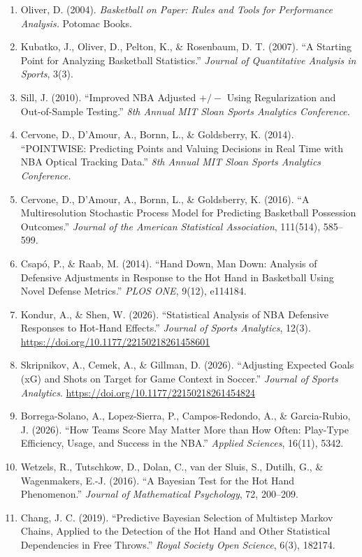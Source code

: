 \documentclass[11pt]{article}
\begin{document}
\begin{enumerate}
\item Oliver, D. (2004). \emph{Basketball on Paper: Rules and Tools for Performance Analysis.} Potomac Books.
\item Kubatko, J., Oliver, D., Pelton, K., \& Rosenbaum, D. T. (2007). ``A Starting Point for Analyzing Basketball Statistics.'' \emph{Journal of Quantitative Analysis in Sports}, 3(3).
\item Sill, J. (2010). ``Improved NBA Adjusted $+/-$ Using Regularization and Out-of-Sample Testing.'' \emph{8th Annual MIT Sloan Sports Analytics Conference.}
\item Cervone, D., D'Amour, A., Bornn, L., \& Goldsberry, K. (2014). ``POINTWISE: Predicting Points and Valuing Decisions in Real Time with NBA Optical Tracking Data.'' \emph{8th Annual MIT Sloan Sports Analytics Conference.}
\item Cervone, D., D'Amour, A., Bornn, L., \& Goldsberry, K. (2016). ``A Multiresolution Stochastic Process Model for Predicting Basketball Possession Outcomes.'' \emph{Journal of the American Statistical Association}, 111(514), 585--599.
\item Csap\'o, P., \& Raab, M. (2014). ``Hand Down, Man Down: Analysis of Defensive Adjustments in Response to the Hot Hand in Basketball Using Novel Defense Metrics.'' \emph{PLOS ONE}, 9(12), e114184.
\item Kondur, A., \& Shen, W. (2026). ``Statistical Analysis of NBA Defensive Responses to Hot-Hand Effects.'' \emph{Journal of Sports Analytics}, 12(3). \url{https://doi.org/10.1177/22150218261458601}
\item Skripnikov, A., Cemek, A., \& Gillman, D. (2026). ``Adjusting Expected Goals (xG) and Shots on Target for Game Context in Soccer.'' \emph{Journal of Sports Analytics}. \url{https://doi.org/10.1177/22150218261454824}
\item Borrega-Solano, A., Lopez-Sierra, P., Campos-Redondo, A., \& Garcia-Rubio, J. (2026). ``How Teams Score May Matter More than How Often: Play-Type Efficiency, Usage, and Success in the NBA.'' \emph{Applied Sciences}, 16(11), 5342.
\item Wetzels, R., Tutschkow, D., Dolan, C., van der Sluis, S., Dutilh, G., \& Wagenmakers, E.-J. (2016). ``A Bayesian Test for the Hot Hand Phenomenon.'' \emph{Journal of Mathematical Psychology}, 72, 200--209.
\item Chang, J. C. (2019). ``Predictive Bayesian Selection of Multistep Markov Chains, Applied to the Detection of the Hot Hand and Other Statistical Dependencies in Free Throws.'' \emph{Royal Society Open Science}, 6(3), 182174.
\end{enumerate}
\end{document}
